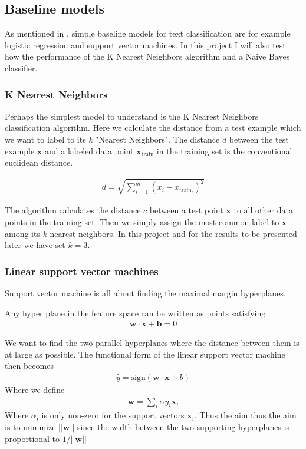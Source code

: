 \subsection{Baseline models}

As mentioned in \cite{BagOfTricks}, simple baseline models for text classification are for example logistic regression and support vector machines. In this project I will also test how the performance of the K Nearest Neighbors algorithm and a Naive Bayes classifier.
%

\subsubsection{K Nearest Neighbors}
Perhaps the simplest model to understand is the K Nearest Neighbors classification algorithm. Here we calculate the distance from a test example which we want to label to its $k$ "Nearest Neighbors". The distance $d$ between the test example $\mathbf{x}$ and a labeled data point $\mathbf{x}_{\text{train}}$ in the training set is the conventional euclidean distance.

\begin{align}
d=\sqrt{\sum_{i=1}^m (x_i-x_{\text{train}_i})^2}
\end{align}

The algorithm calculates the distance $c$ between a test point $\mathbf{x}$ to all other data points in the training set. Then we simply assign the most common label to $\mathbf{x}$ among its $k$ nearest neighbors. In this project and for the results to be presented later we have set $k=3$.

\subsubsection{Linear support vector machines}
Support vector machine is all about finding the maximal margin hyperplanes.

Any hyper plane in the feature space can be written as points satisfying
\begin{align}
    \mathbf{w}\cdot\mathbf{x} + \mathbf{b} = 0
\end{align}

We want to find the two parallel hyperplanes where the distance between them is at large as possible.
The functional form of the linear support vector machine then becomes
\begin{align}
    \hat{y} = \text{sign}(\mathbf{w}\cdot \mathbf{x} + b)
\end{align}
Where we define
\begin{align}
    \mathbf{w} = \sum_i \alpha y_i \mathbf{x}_i
\end{align}
Where $\alpha_i$ is only non-zero for the support  vectors $\mathbf{x}_i$. Thus the aim thus the aim is to minimize $||\mathbf{w}||$ since the width between the two supporting hyperplanes is proportional to $1/||\mathbf{w}||$

